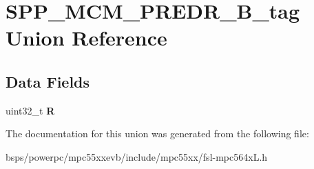 \hypertarget{unionSPP__MCM__PREDR__32B__tag}{}\section{S\+P\+P\+\_\+\+M\+C\+M\+\_\+\+P\+R\+E\+D\+R\+\_\+B\+\_\+tag Union Reference}
\label{unionSPP__MCM__PREDR__32B__tag}
\subsection*{Data Fields}
\begin{DoxyCompactItemize}
\item 
\mbox{\label{unionSPP__MCM__PREDR__32B__tag_a82f82977b95234e31e63986d0ab0f895}} 
uint32\+\_\+t {\bfseries R}
\end{DoxyCompactItemize}


The documentation for this union was generated from the following file\+:\begin{DoxyCompactItemize}
\item 
bsps/powerpc/mpc55xxevb/include/mpc55xx/fsl-\/mpc564x\+L.\+h\end{DoxyCompactItemize}
